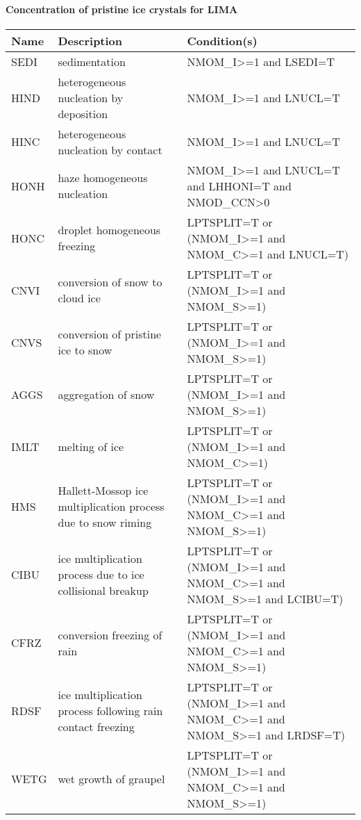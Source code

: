 \paragraph{Concentration of pristine ice crystals for LIMA}
\mbox{} %

\begin{longtable} {|p{}|p{}|p{}|}
\hline
Name & Description & Condition(s) \\
\hline \hline
\endhead
SEDI   & sedimentation                                  & NMOM\_I>=1 and LSEDI=T \\\hline
HIND   & heterogeneous nucleation by deposition         & NMOM\_I>=1 and LNUCL=T \\\hline
HINC   & heterogeneous nucleation by contact            & NMOM\_I>=1 and LNUCL=T \\\hline
HONH   & haze homogeneous nucleation                    & NMOM\_I>=1 and LNUCL=T and LHHONI=T and NMOD\_CCN>0 \\\hline
HONC   & droplet homogeneous freezing                   & LPTSPLIT=T or (NMOM\_I>=1 and NMOM\_C>=1 and LNUCL=T) \\\hline
CNVI   & conversion of snow to cloud ice                & LPTSPLIT=T or (NMOM\_I>=1 and NMOM\_S>=1) \\\hline
CNVS   & conversion of pristine ice to snow             & LPTSPLIT=T or (NMOM\_I>=1 and NMOM\_S>=1) \\\hline
AGGS   & aggregation of snow                            & LPTSPLIT=T or (NMOM\_I>=1 and NMOM\_S>=1) \\\hline
IMLT   & melting of ice                                 & LPTSPLIT=T or (NMOM\_I>=1 and NMOM\_C>=1) \\\hline
HMS    & Hallett-Mossop ice multiplication process due to snow riming    & LPTSPLIT=T or (NMOM\_I>=1 and NMOM\_C>=1 and NMOM\_S>=1) \\\hline
CIBU   & ice multiplication process due to ice collisional breakup & LPTSPLIT=T or (NMOM\_I>=1 and NMOM\_C>=1 and NMOM\_S>=1 and LCIBU=T) \\\hline
CFRZ   & conversion freezing of rain                    & LPTSPLIT=T or (NMOM\_I>=1 and NMOM\_C>=1 and NMOM\_S>=1) \\\hline
RDSF   & ice multiplication process following rain contact freezing & LPTSPLIT=T or (NMOM\_I>=1 and NMOM\_C>=1 and NMOM\_S>=1 and LRDSF=T) \\\hline
WETG   & wet growth of graupel                          & LPTSPLIT=T or (NMOM\_I>=1 and NMOM\_C>=1 and NMOM\_S>=1) \\\hline

\end{longtable}
